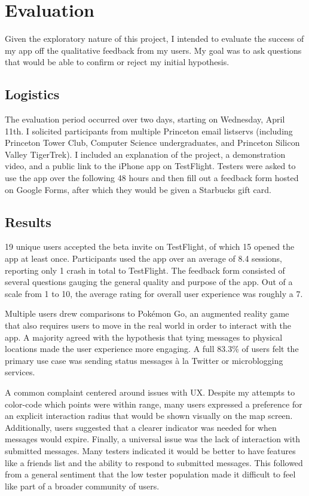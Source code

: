 \section{Evaluation}

Given the exploratory nature of this project, I intended to evaluate the success of my app off the qualitative feedback from my users. My goal was to ask questions that would be able to confirm or reject my initial hypothesis.

\subsection{Logistics}

The evaluation period occurred over two days, starting on Wednesday, April 11th. I solicited participants from multiple Princeton email listservs (including Princeton Tower Club, Computer Science undergraduates, and Princeton Silicon Valley TigerTrek). I included an explanation of the project, a demonstration video, and a public link to the iPhone app on TestFlight. Testers were asked to use the app over the following 48 hours and then fill out a feedback form hosted on Google Forms, after which they would be given a Starbucks gift card.

\subsection{Results}

19 unique users accepted the beta invite on TestFlight, of which 15 opened the app at least once. Participants used the app over an average of 8.4 sessions, reporting only 1 crash in total to TestFlight. The feedback form consisted of several questions gauging the general quality and purpose of the app. Out of a scale from 1 to 10, the average rating for overall user experience was roughly a 7.

Multiple users drew comparisons to Pokémon Go, an augmented reality game that also requires users to move in the real world in order to interact with the app. A majority agreed with the hypothesis that tying messages to physical locations made the user experience more engaging. A full 83.3\% of users felt the primary use case was sending status messages à la Twitter or microblogging services.

A common complaint centered around issues with \textsc{UX}. Despite my attempts to color-code which points were within range, many users expressed a preference for an explicit interaction radius that would be shown visually on the map screen. Additionally, users suggested that a clearer indicator was needed for when messages would expire. Finally, a universal issue was the lack of interaction with submitted messages. Many testers indicated it would be better to have features like a friends list and the ability to respond to submitted messages. This followed from a general sentiment that the low tester population made it difficult to feel like part of a broader community of users.

